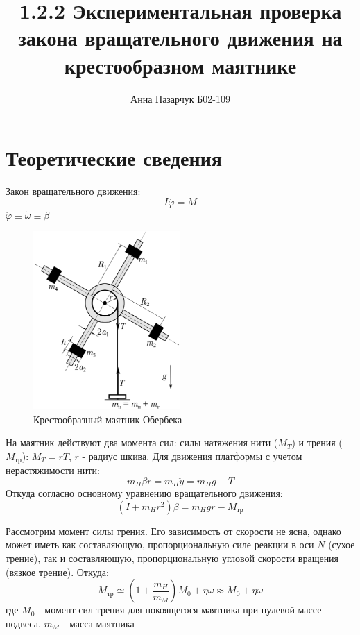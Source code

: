 \documentclass[a4paper,12pt]{article} %
\author{Анна Назарчук Б02-109}
\title{1.2.2 Экспериментальная проверка закона вращательного движения на крестообразном маятнике}
\date{}
\begin{document}
\maketitle

\section{Теоретические сведения}
Закон вращательного движения:
\begin{equation}
I\ddot{\varphi} = M
\end{equation}
$\ddot{\varphi} \equiv \dot{\omega} \equiv \beta$

\begin{figure}[h!]
\begin{center}
\includegraphics[width=0.5\textwidth]{Маятник}
\end{center}
\caption{Крестообразный маятник Обербека} \label{маятник}
\end{figure}
На маятник действуют два момента сил: силы натяжения нити ($M_T$) и трения ($M_\text{тр}$): $M_T = rT$, $r$ - радиус шкива. Для движения платформы с учетом нерастяжимости нити:
\[m_H \beta r = m_H\ddot{y} = m_Hg - T\]
Откуда согласно основному уравнению вращательного движения:
\begin{equation}
(I+m_Hr^2)\beta = m_Hgr-M_\text{тр}
\label{M_T}
\end{equation}

Рассмотрим момент силы трения. Его зависимость от скорости не ясна, однако может иметь как составляющую, пропорциональную силе реакции в оси $N$ (сухое трение), так и составляющую, пропорциональную угловой скорости вращения (вязкое трение). Откуда:
\begin{equation}
M_\text{тр} \simeq (1 + \frac{m_H}{m_M}) M_0 + \eta \omega \approx M_0 +\eta \omega
\label{трение}
\end{equation} 
где $M_0$ - момент сил трения для покоящегося маятника при нулевой массе подвеса, $m_M$ - масса маятника 
\end{document}
